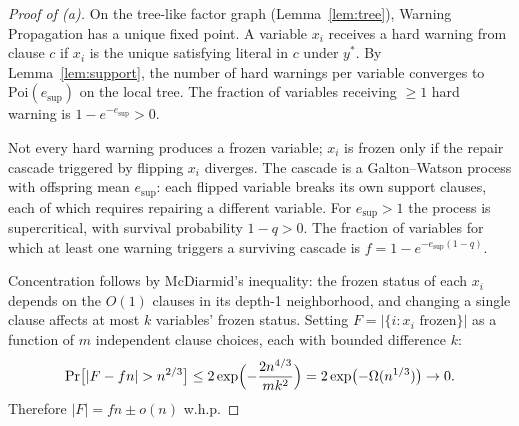 \documentclass[11pt]{article}
\begin{document}
\begin{proof}[Proof of (a)]
On the tree-like factor graph (Lemma~\ref{lem:tree}), Warning Propagation has a unique fixed point.  A variable $x_i$ receives a hard warning from clause $c$ if $x_i$ is the unique satisfying literal in $c$ under $y^*$.  By Lemma~\ref{lem:support}, the number of hard warnings per variable converges to $\mathrm{Poi}(e_{\mathrm{sup}})$ on the local tree.  The fraction of variables receiving $\geq 1$ hard warning is $1 - e^{-e_{\mathrm{sup}}} > 0$.

Not every hard warning produces a frozen variable; $x_i$ is frozen only if the repair cascade triggered by flipping $x_i$ diverges.  The cascade is a Galton--Watson process with offspring mean $e_{\mathrm{sup}}$: each flipped variable breaks its own support clauses, each of which requires repairing a different variable.  For $e_{\mathrm{sup}} > 1$ the process is supercritical, with survival probability $1 - q > 0$.  The fraction of variables for which at least one warning triggers a surviving cascade is $f = 1 - e^{-e_{\mathrm{sup}}(1-q)}$.

Concentration follows by McDiarmid's inequality: the frozen status of each $x_i$ depends on the $O(1)$ clauses in its depth-1 neighborhood, and changing a single clause affects at most $k$ variables' frozen status.  Setting $F = |\{i : x_i \text{ frozen}\}|$ as a function of $m$ independent clause choices, each with bounded difference $k$:
\[
\Pr\bigl[|F - fn| > n^{2/3}\bigr] \leq 2\exp\Bigl(-\frac{2n^{4/3}}{mk^2}\Bigr) = 2\exp\bigl(-\Omega(n^{1/3})\bigr) \to 0.
\]
Therefore $|F| = fn \pm o(n)$ w.h.p.
\end{proof}
\end{document}
